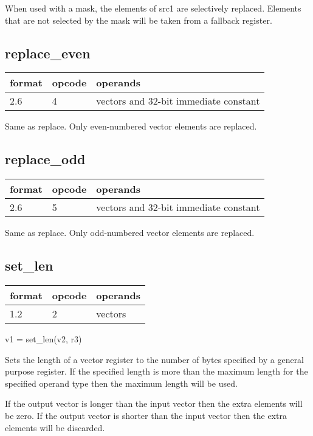 \documentclass[forwardcom.tex]{subfiles}
\begin{document}
When used with a mask, the elements of src1 are selectively replaced. Elements that are not selected by the mask will be taken from a fallback register.
\vv

\subsection{replace\_even}
\label{table:replaceEvenInstruction}
\begin{tabular}{|p{12mm}|p{15mm}|p{100mm}|}
\hline
\bfseries format & \bfseries opcode & \bfseries operands \\ \hline
2.6 & 4 & vectors and 32-bit immediate constant \\ \hline
\end{tabular}
\vv

Same as replace. Only even-numbered vector elements are replaced.
\vv

\subsection{replace\_odd}
\label{table:replaceOddInstruction}
\begin{tabular}{|p{12mm}|p{15mm}|p{100mm}|}
\hline
\bfseries format & \bfseries opcode & \bfseries operands \\ \hline
2.6 & 5 & vectors and 32-bit immediate constant \\ \hline
\end{tabular}
\vv

Same as replace. Only odd-numbered vector elements are replaced.
\vv

\subsection{set\_len}
\label{table:setLenInstruction}
\begin{tabular}{|p{12mm}|p{15mm}|p{100mm}|}
\hline
\bfseries format & \bfseries opcode & \bfseries operands \\ \hline
1.2 & 2 & vectors \\ \hline
\end{tabular}
\vv

v1 = set\_len(v2, r3)
\vv

Sets the length of a vector register to the number of bytes specified by a general purpose register. If the specified length is more than the maximum length for the specified operand type then the maximum length will be used.
\vv

If the output vector is longer than the input vector then the extra elements will be zero. If the output vector is shorter than the input vector then the extra elements will be discarded. 
\vv
\end{document}
